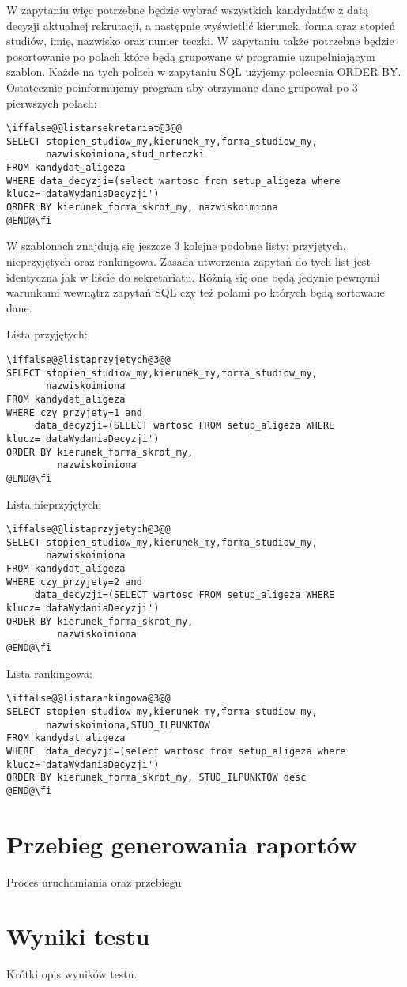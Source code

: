 W zapytaniu więc potrzebne będzie wybrać wszystkich kandydatów z datą decyzji aktualnej rekrutacji, a następnie wyświetlić kierunek, forma oraz stopień studiów, imię, nazwisko oraz numer teczki. W zapytaniu także potrzebne będzie posortowanie po polach które będą grupowane w programie uzupełniającym szablon. Każde na tych polach w zapytaniu SQL użyjemy polecenia ORDER BY. Ostatecznie poinformujemy program aby otrzymane dane grupował po 3 pierwszych polach:
 \begin{verbatim}
\iffalse@@listarsekretariat@3@@
SELECT stopien_studiow_my,kierunek_my,forma_studiow_my,
       nazwiskoimiona,stud_nrteczki
FROM kandydat_aligeza
WHERE data_decyzji=(select wartosc from setup_aligeza where klucz='dataWydaniaDecyzji')
ORDER BY kierunek_forma_skrot_my, nazwiskoimiona
@END@\fi
\end{verbatim}

W szablonach znajdują się jeszcze 3 kolejne podobne listy: przyjętych, nieprzyjętych oraz rankingowa. Zasada utworzenia zapytań do tych list jest identyczna jak w liście do sekretariatu. Różnią się one będą jedynie pewnymi warunkami wewnątrz zapytań SQL czy też polami po których będą sortowane dane.

\par Lista przyjętych:
 \begin{verbatim}
\iffalse@@listaprzyjetych@3@@
SELECT stopien_studiow_my,kierunek_my,forma_studiow_my,
       nazwiskoimiona 
FROM kandydat_aligeza 
WHERE czy_przyjety=1 and
     data_decyzji=(SELECT wartosc FROM setup_aligeza WHERE klucz='dataWydaniaDecyzji')
ORDER BY kierunek_forma_skrot_my,
         nazwiskoimiona
@END@\fi
\end{verbatim}
\par Lista nieprzyjętych:
 \begin{verbatim}
\iffalse@@listaprzyjetych@3@@
SELECT stopien_studiow_my,kierunek_my,forma_studiow_my,
       nazwiskoimiona 
FROM kandydat_aligeza 
WHERE czy_przyjety=2 and
     data_decyzji=(SELECT wartosc FROM setup_aligeza WHERE klucz='dataWydaniaDecyzji')
ORDER BY kierunek_forma_skrot_my,
         nazwiskoimiona
@END@\fi
\end{verbatim}
\par Lista  rankingowa:
 \begin{verbatim}
\iffalse@@listarankingowa@3@@
SELECT stopien_studiow_my,kierunek_my,forma_studiow_my,
       nazwiskoimiona,STUD_ILPUNKTOW
FROM kandydat_aligeza
WHERE  data_decyzji=(select wartosc from setup_aligeza where klucz='dataWydaniaDecyzji')
ORDER BY kierunek_forma_skrot_my, STUD_ILPUNKTOW desc
@END@\fi
\end{verbatim}





\section{Przebieg generowania raportów}

Proces uruchamiania oraz przebiegu

\section{Wyniki testu}

Krótki opis wyników testu.


